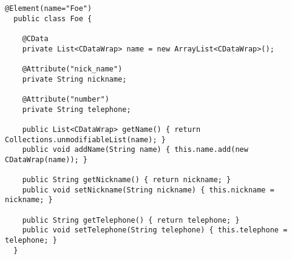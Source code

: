 \begin{lstlisting}[float,caption={Foe class.},label=alg:foe,captionpos=b, frame=single, frameround=tttt]
  @Element(name="Foe")
  public class Foe { 

    @CData 
    private List<CDataWrap> name = new ArrayList<CDataWrap>();

    @Attribute("nick_name") 
    private String nickname;

    @Attribute("number") 
    private String telephone;
    
    public List<CDataWrap> getName() { return Collections.unmodifiableList(name); }
    public void addName(String name) { this.name.add(new CDataWrap(name)); }

    public String getNickname() { return nickname; }
    public void setNickname(String nickname) { this.nickname = nickname; }

    public String getTelephone() { return telephone; }
    public void setTelephone(String telephone) { this.telephone = telephone; }
  }
\end{lstlisting}








